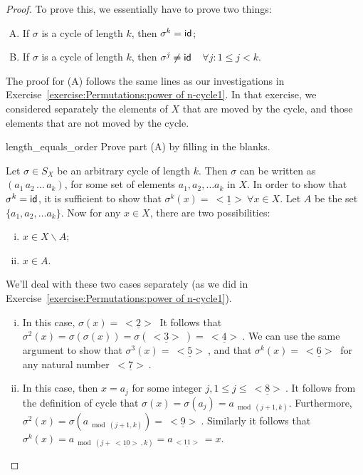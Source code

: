 \begin{proof}
To prove this, we essentially have to prove two things:
\begin{enumerate}[(A)]
\item
If $\sigma$ is a cycle of length $k$, then $\sigma^k = {\sf{i}d} $;
\item
If $\sigma$ is a cycle of length $k$, then $\sigma^j \neq {\sf{i}d} $~~$\forall j: 1 \le j < k.$
\end{enumerate}

\noindent
The proof for (A) follows the same lines as our investigations in Exercise~\ref{exercise:Permutations:power of n-cycle1}. In that exercise, we considered separately the elements of $X$ that are moved by the cycle, and those elements that are not moved by the cycle. 

\begin{exercise}{length_equals_order} Prove part (A) by filling in the blanks.

\noindent
Let $\sigma \in S_X$ be an arbitrary cycle of length $k$.  Then $\sigma$ can be written as $ (a_1 \, a_2 \, \ldots \, a_k)$, for some set of elements $a_1, a_2, \ldots a_k$ in $X$.  In order to show that $\sigma^k = {\sf{i}d} $, it is sufficient to show that 
$\sigma^k(x) = \underline{~<1>~}  \forall x \in X$. 
Let $A$ be the set  $\{a_1, a_2, \ldots a_k\}$.  Now for any $x \in X$, there are two possibilities:  
\begin{enumerate}[(i)]
\item
$x \in  X \backslash A$;
\item
$x \in A$. 
\end{enumerate}

\noindent
We'll deal with these two cases separately (as we did  in Exercise~\ref{exercise:Permutations:power of n-cycle1}).

\begin{enumerate}[(i)]
\item
In this case, $\sigma(x) = \underline{~<2>~} $  It follows that $\sigma^2(x) = \sigma( \sigma(x)) = \sigma( \underline{~<3>~}) = \underline{~<4>~}$. We can use the same argument to show that $\sigma^3(x) = \underline{~<5>~}$, and that $\sigma^k(x) = \underline{~<6>~}$ for any natural number $\underline{~<7>~}$.
\item
In this case, then $x = a_j$ for some integer $j, 1 \le j \le \underline{~<8>~}$.  It follows from the definition of cycle that $\sigma(x) = \sigma(a_j) = a_{\bmod(j+1,k)}$. Furthermore, $\sigma^2(x) = \sigma(a_{\bmod(j+1,k)}) = \underline{~<9>~}$. Similarly it follows that $\sigma^{k}(x) = a_{\bmod(j+ \underline{~<10>~},k)} = a_{\underline{~<11>~}} = x$.
\end{enumerate}


\end{exercise}
\end{proof}
